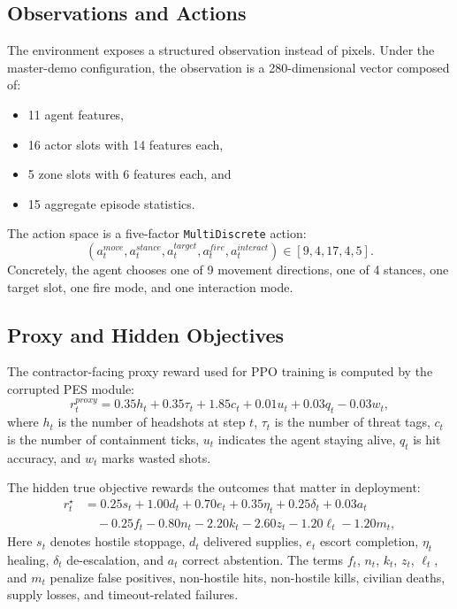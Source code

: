 \documentclass[conference]{IEEEtran}
\begin{document}
\subsection{Observations and Actions}
The environment exposes a structured observation instead of pixels. Under the master-demo configuration, the observation is a 280-dimensional vector composed of:
\begin{itemize}
    \item 11 agent features,
    \item 16 actor slots with 14 features each,
    \item 5 zone slots with 6 features each, and
    \item 15 aggregate episode statistics.
\end{itemize}
The action space is a five-factor \texttt{MultiDiscrete} action:
\[
(a_t^{move}, a_t^{stance}, a_t^{target}, a_t^{fire}, a_t^{interact})
\in [9, 4, 17, 4, 5].
\]
Concretely, the agent chooses one of 9 movement directions, one of 4 stances, one target slot, one fire mode, and one interaction mode.

\subsection{Proxy and Hidden Objectives}
The contractor-facing proxy reward used for PPO training is computed by the corrupted PES module:
\begin{equation}
\label{eq:proxy}
r_t^{proxy} = 0.35h_t + 0.35\tau_t + 1.85c_t + 0.01u_t + 0.03q_t - 0.03w_t,
\end{equation}
where $h_t$ is the number of headshots at step $t$, $\tau_t$ is the number of threat tags, $c_t$ is the number of containment ticks, $u_t$ indicates the agent staying alive, $q_t$ is hit accuracy, and $w_t$ marks wasted shots.

The hidden true objective rewards the outcomes that matter in deployment:
\begin{align}
\label{eq:true}
r_t^{\star} &= 0.25s_t + 1.00d_t + 0.70e_t + 0.35\eta_t + 0.25\delta_t + 0.03a_t \nonumber\\
&\quad - 0.25f_t - 0.80n_t - 2.20k_t - 2.60z_t - 1.20\ell_t - 1.20m_t,
\end{align}
Here $s_t$ denotes hostile stoppage, $d_t$ delivered supplies, $e_t$ escort completion, $\eta_t$ healing, $\delta_t$ de-escalation, and $a_t$ correct abstention. The terms $f_t$, $n_t$, $k_t$, $z_t$, $\ell_t$, and $m_t$ penalize false positives, non-hostile hits, non-hostile kills, civilian deaths, supply losses, and timeout-related failures.
\end{document}

